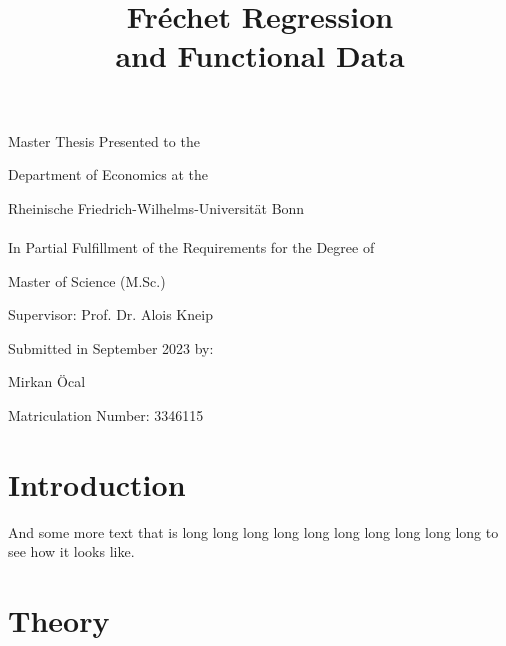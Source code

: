 \documentclass[12pt, a4paper, bibtotoc, liststotoc]{scrartcl}
\begin{document}
\begin{titlepage}
    \title{
        Fréchet Regression \\
        and Functional Data
    }
    \vspace{\fill}
    \author{}
    \date{}
    \maketitle

    \vspace{\fill}
    \begin{center}
        \large
        Master Thesis Presented to the

        Department of Economics at the

        Rheinische Friedrich-Wilhelms-Universität Bonn \\
        \ \\

        In Partial Fulfillment of the Requirements for the Degree of

        Master of Science (M.Sc.)

        \vspace{\fill}
        Supervisor: Prof. Dr. Alois Kneip

        \vspace{\fill}
        Submitted in September 2023 by:

        Mirkan Öcal

        Matriculation Number: 3346115
    \end{center}

    \thispagestyle{empty}
\end{titlepage}


\newpage %
\tableofcontents    %
\listoftables       %
\listoffigures      %

\newpage
{}

\section{Introduction}
\label{sec:introduction}

\citet{petersen_frechet_2019}
\citet{hall_methodology_2007}

And some more text that is long long long long long long long long long long to see how
it looks like.

\section{Theory}
\label{sec:theory}
\end{document}
